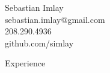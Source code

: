 \documentclass[9pt]{article}
\newenvironment{changemargin}[2]{%
  \begin{list}{}{%
    \setlength{\topsep}{0pt}%
    \setlength{\leftmargin}{#1}%
    \setlength{\rightmargin}{#2}%
    \setlength{\listparindent}{\parindent}%
    \setlength{\itemindent}{\parindent}%
    \setlength{\parsep}{\parskip}%
  }%
  \item[]}{\end{list}
}
\newcommand{\lineover}{
    \begin{changemargin}{-0.05in}{-0.05in}
        \vspace*{-8pt}
        \hrulefill \\
        \vspace*{-2pt}
    \end{changemargin}
}
\newcommand{\header}[1]{
    \begin{changemargin}{-0.5in}{-0.5in}
        {\large #1}\\
        \lineover
    \end{changemargin}
}
\newcommand{\contact}[4]{
    \begin{changemargin}{-0.5in}{-0.5in}
        \begin{center}
            {\Large {#1}}\\ \smallskip
            {#2}\\ \smallskip
            {#3}
        \end{center}
    \end{changemargin}
}
\begin{document}

\begin{changemargin}{-0.5in}{-0.5in}
    \begin{center}
        {\Large Sebastian Imlay}\\ \smallskip
        {sebastian.imlay@gmail.com}\\ \smallskip
        {208.290.4936}\\ \smallskip
        {github.com/simlay}
    \end{center}
\end{changemargin}


\header{Experience}
\end{document}
